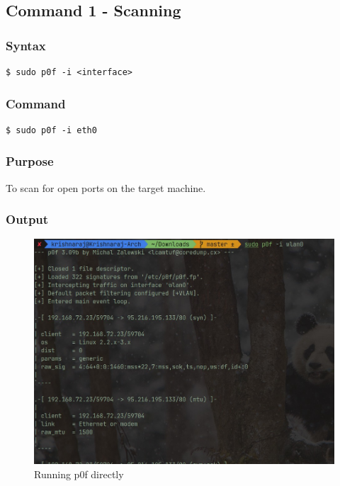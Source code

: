 \documentclass[11pt]{article}
\begin{document}
\subsection{Command 1 - Scanning}

\subsubsection*{Syntax}
\begin{verbatim}
$ sudo p0f -i <interface>
\end{verbatim}

\subsubsection*{Command}
\begin{verbatim}
$ sudo p0f -i eth0
\end{verbatim}

\subsubsection*{Purpose}
To scan for open ports on the target machine.

\subsubsection*{Output}

\begin{figure}[H]
    \centering
    \includegraphics[width=1.00\textwidth]{p0f/direct running p0f.jpg}
    \caption{Running p0f directly}
\end{figure}
\end{document}
